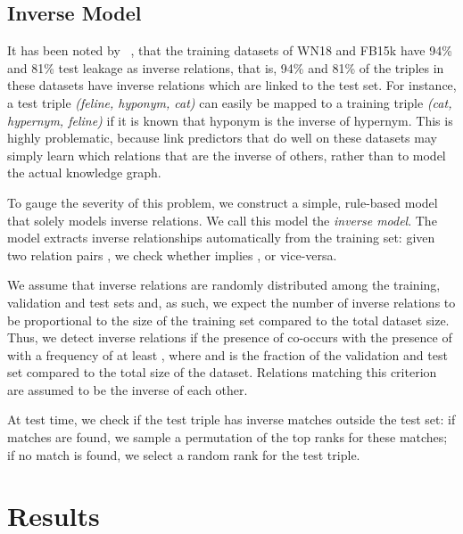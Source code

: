 \documentclass[letterpaper]{article}
\newcommand{\citet}[1]{\citeauthor{#1}~\shortcite{#1}}
\begin{document}
\subsection{Inverse Model}


It has been noted by \citet{toutanova2015observed}, that the training datasets of WN18 and FB15k have 94\% and 81\% test leakage as inverse relations, that is, 94\% and 81\% of the triples in these datasets have inverse relations which are linked to the test set.
For instance, a test triple \textit{(feline, hyponym, cat)} can easily be mapped to a training triple \textit{(cat, hypernym, feline)} if it is known that hyponym is the inverse of hypernym.
This is highly problematic, because link predictors that do well on these datasets may simply learn which relations that are the inverse of others, rather than to model the actual knowledge graph.


To gauge the severity of this problem, we construct a simple, rule-based model that solely models inverse relations. We call this model the \emph{inverse model}.
The model extracts inverse relationships automatically from the training set: given two relation pairs , we check whether  implies , or vice-versa. 


We assume that inverse relations are randomly distributed among the training, validation and test sets and, as such, we expect the number of inverse relations to be proportional to the size of the training set compared to the total dataset size.
Thus, we detect inverse relations if the presence of  co-occurs with the presence of  with a frequency of at least , where  and  is the fraction of the validation and test set compared to the total size of the dataset.
Relations matching this criterion are assumed to be the inverse of each other.


At test time, we check if the test triple has inverse matches outside the test set: if  matches are found, we sample a permutation of the top  ranks for these matches; if no match is found, we select a random rank for the test triple.


\section{Results}
\end{document}
